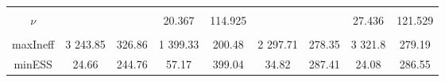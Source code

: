 \begin{footnotesize}
\begin{singlespace}
\begin{tabular}{ccccccccc}
 & \begin{tiny} [-0.138,0.057] \end{tiny}  & \begin{tiny} [-0.107,0.04] \end{tiny}  & \begin{tiny} [-0.137,0.061] \end{tiny}  & \begin{tiny} [-0.107,0.04] \end{tiny}  & \begin{tiny} [-0.259,-0.115] \end{tiny}  & \begin{tiny} [-0.213,-0.107] \end{tiny}  & \begin{tiny} [-0.26,-0.115] \end{tiny}  & \begin{tiny} [-0.208,-0.103] \end{tiny}  \\ 
$\nu$ &  &  & 20.367 &  114.925 &  &  & 27.436 &  121.529 \\ 
 &  &  & \begin{tiny} [15,25.8] \end{tiny}  & \begin{tiny} [93, 128] \end{tiny}  &  &  & \begin{tiny} [21.4,33.8] \end{tiny}  & \begin{tiny} [ 109.9, 128] \end{tiny}  \\  \midrule 
maxIneff & 3 243.85 &  326.86 & 1 399.33 &  200.48 & 2 297.71 &  278.35 & 3 321.8 &  279.19 \\ 
minESS & 24.66 &  244.76 & 57.17 &  399.04 & 34.82 &  287.41 & 24.08 &  286.55 \\\bottomrule 
\end{tabular}
\end{singlespace}
\end{footnotesize}

